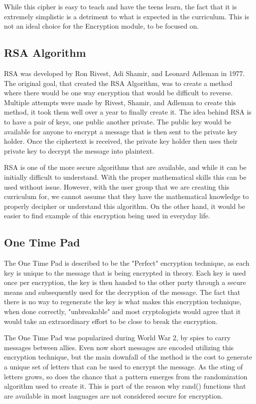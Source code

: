 \documentclass[onecolumn, draftclsnofoot,10pt, compsoc]{IEEEtran}
\begin{document}
While this cipher is easy to teach and have the teens learn, the fact that it is extremely simplistic is a detriment to what is expected in the curriculum. This is not an ideal choice for the Encryption module, to be focused on. 
\subsection{RSA Algorithm}
RSA was developed by Ron Rivest, Adi Shamir, and Leonard Adleman in 1977. The original goal, that created the RSA Algorithm, was to create a method where there would be one way encryption that would be difficult to reverse. Multiple attempts were made by Rivest, Shamir, and Adleman to create this method, it took them well over a year to finally create it. The idea behind RSA is to have a pair of keys, one public another private. The public key would be available for anyone to encrypt a message that is then sent to the private key holder. Once the ciphertext is received, the private key holder then uses their private key to decrypt the message into plaintext. 

RSA is one of the more secure algorithms that are available, and while it can be initially difficult to understand. With the proper mathematical skills this can be used without issue. However, with the user group that we are creating this curriculum for, we cannot assume that they have the mathematical knowledge to properly decipher or understand this algorithm. On the other hand, it would be easier to find example of this encryption being used in everyday life.
\subsection{One Time Pad}
The One Time Pad is described to be the "Perfect" encryption technique, as each key is unique to the message that is being encrypted in theory. Each key is used once per encryption, the key is then handed to the other party through a secure means and subsequently used for the decryption of the message. The fact that there is no way to regenerate the key is what makes this encryption technique, when done correctly, "unbreakable" and most cryptologists would agree that it would take an extraordinary effort to be close to break the encryption.

The One Time Pad was popularized during World War 2, by spies to carry messages between allies. Even now short messages are encoded utilizing this encryption technique, but the main downfall of the method is the cost to generate a unique set of letters that can be used to encrypt the message. As the sting of letters grows, so does the chance that a pattern emerges from the randomization algorithm used to create it. This is part of the reason why rand() functions that are available in most languages are not considered secure for encryption. 
\end{document}
